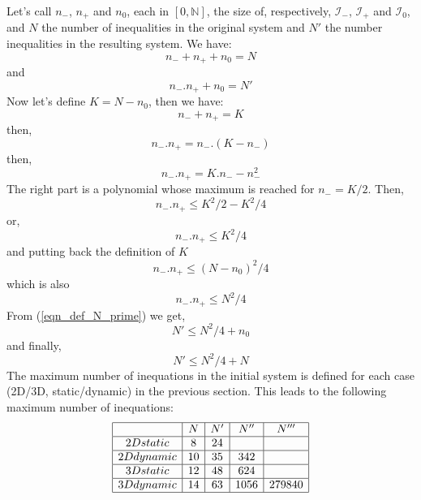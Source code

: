 \documentclass[12pt, a4paper]{article}
\begin{document}
Let's call $n_-$, $n_+$ and $n_0$, each in $[0,\mathbb{N}]$, the size of, respectively, $\mathcal{I}_-$, $\mathcal{I}_+$ and $\mathcal{I}_0$, and $N$ the number of inequalities in the original system and $N'$ the number inequalities in the resulting system. We have:\\
\begin{equation}
n_-+n_++n_0=N
\end{equation}
and
\begin{equation}
\label{eqn_def_N_prime}
n_-.n_++n_0=N'
\end{equation}
Now let's define $K=N-n_0$, then we have:\\
\begin{equation}
n_-+n_+=K
\end{equation}
then,
\begin{equation}
n_-.n_+=n_-.(K-n_-)
\end{equation}
then,
\begin{equation}
n_-.n_+=K.n_--n_-^2
\end{equation}
The right part is a polynomial whose maximum is reached for $n_-=K/2$. Then,
\begin{equation}
n_-.n_+\le K^2/2-K^2/4
\end{equation}
or,
\begin{equation}
n_-.n_+\le K^2/4
\end{equation}
and putting back the definition of $K$
\begin{equation}
n_-.n_+\le (N-n_0)^2/4
\end{equation}
which is also
\begin{equation}
n_-.n_+\le N^2/4
\end{equation}
From (\ref{eqn_def_N_prime}) we get,
\begin{equation}
N'\le N^2/4+n_0
\end{equation}
and finally,
\begin{equation}
N'\le N^2/4+N
\end{equation}
The maximum number of inequations in the initial system is defined for each case (2D/3D, static/dynamic) in the previous section. This leads to the following maximum number of inequations:\\
$$
\begin{array}{|c|c|c|c|c|}
\hline
&N&N'&N''&N'''\\
\hline
2Dstatic&8&24&&\\
\hline
2Ddynamic&10&35&342&\\
\hline
3Dstatic&12&48&624&\\
\hline
3Ddynamic&14&63&1056&279840\\
\hline
\end{array}
$$
\end{document}
